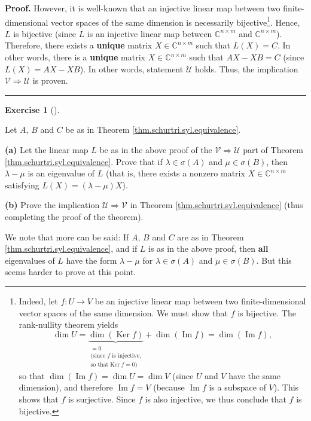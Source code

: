 \documentclass[numbers=enddot,12pt,final,onecolumn,notitlepage]{scrartcl}%
\newcounter{exer}
\numberwithin{exer}{subsection}
\theoremstyle{definition}
\newtheorem{exmp}[exer]{Exercise}
\newenvironment{exercise}[1][]
{\begin{exmp}[#1]\begin{leftbar}}
{\end{leftbar}\end{exmp}}
\newenvironment{proof}[1][Proof]{\noindent\textbf{#1.} }{\ \rule{0.5em}{0.5em}}
\begin{document}
\begin{proof}
However, it is well-known that an injective linear map between two
finite-dimensional vector spaces of the same dimension is necessarily
bijective\footnote{Indeed, let $f:U\rightarrow V$ be an injective linear map
between two finite-dimensional vector spaces of the same dimension. We must
show that $f$ is bijective. The rank-nullity theorem yields%
\[
\dim U=\underbrace{\dim\left(  \operatorname*{Ker}f\right)  }%
_{\substack{=0\\\text{(since }f\text{ is injective,}\\\text{so that
}\operatorname*{Ker}f=0\text{)}}}+\dim\left(  \operatorname{Im}f\right)
=\dim\left(  \operatorname{Im}f\right)  ,
\]
so that $\dim\left(  \operatorname{Im}f\right)  =\dim U=\dim V$ (since $U$ and
$V$ have the same dimension), and therefore $\operatorname{Im}f=V$ (because
$\operatorname{Im}f$ is a subspace of $V$). This shows that $f$ is surjective.
Since $f$ is also injective, we thus conclude that $f$ is bijective.}. Hence,
$L$ is bijective (since $L$ is an injective linear map between $\mathbb{C}%
^{n\times m}$ and $\mathbb{C}^{n\times m}$). Therefore, there exists a
\textbf{unique} matrix $X\in\mathbb{C}^{n\times m}$ such that $L\left(
X\right)  =C$. In other words, there is a \textbf{unique} matrix
$X\in\mathbb{C}^{n\times m}$ such that $AX-XB=C$ (since $L\left(  X\right)
=AX-XB$). In other words, statement $\mathcal{U}$ holds. Thus, the implication
$\mathcal{V}\Longrightarrow\mathcal{U}$ is proven.
\end{proof}

\begin{exercise}
\label{exe.schurtri.syl.sigA-B} Let $A$, $B$ and $C$ be as in Theorem
\ref{thm.schurtri.syl.equivalence}. \medskip

\textbf{(a)} Let the linear map $L$ be as in the above proof of the
$\mathcal{V}\Longrightarrow\mathcal{U}$ part of Theorem
\ref{thm.schurtri.syl.equivalence}. Prove that if $\lambda\in\sigma\left(
A\right)  $ and $\mu\in\sigma\left(  B\right)  $, then $\lambda-\mu$ is an
eigenvalue of $L$ (that is, there exists a nonzero matrix $X\in\mathbb{C}%
^{n\times m}$ satisfying $L\left(  X\right)  =\left(  \lambda-\mu\right)  X$).
\medskip

\textbf{(b)} Prove the implication $\mathcal{U}\Longrightarrow\mathcal{V}$ in
Theorem \ref{thm.schurtri.syl.equivalence} (thus completing the proof of the theorem).
\end{exercise}

We note that more can be said: If $A$, $B$ and $C$ are as in Theorem
\ref{thm.schurtri.syl.equivalence}, and if $L$ is as in the above proof, then
\textbf{all} eigenvalues of $L$ have the form $\lambda-\mu$ for $\lambda
\in\sigma\left(  A\right)  $ and $\mu\in\sigma\left(  B\right)  $. But this
seems harder to prove at this point. \medskip
\end{document}
